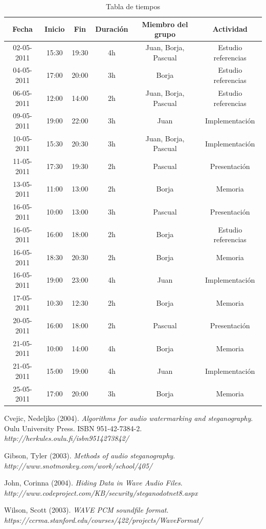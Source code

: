 \documentclass[12pt]{article}
\begin{document}
\begin{table}[h]

\centering
\begin{tabular}{|c|c|c|c|c|c|}
\hline Fecha & Inicio & Fin & Duración & Miembro del grupo & Actividad  \\ 
\hline 02-05-2011 & 15:30 & 19:30 & 4h & Juan, Borja, Pascual & Estudio referencias  \\
\hline 04-05-2011 & 17:00 & 20:00 & 3h & Borja & Estudio referencias  \\
\hline 06-05-2011 & 12:00 & 14:00 & 2h & Juan, Borja, Pascual & Estudio referencias  \\
\hline 09-05-2011 & 19:00 & 22:00 & 3h & Juan & Implementación  \\
\hline 10-05-2011 & 15:30 & 20:30 & 3h & Juan, Borja, Pascual & Implementación \\
\hline 11-05-2011 & 17:30 & 19:30 & 2h & Pascual & Presentación \\
\hline 13-05-2011 & 11:00 & 13:00 & 2h & Borja & Memoria \\
\hline 16-05-2011 & 10:00 & 13:00 & 3h & Pascual & Presentación \\
\hline 16-05-2011 & 16:00 & 18:00 & 2h & Borja & Estudio referencias \\
\hline 16-05-2011 & 18:30 & 20:30 & 2h & Borja & Memoria \\
\hline 16-05-2011 & 19:00 & 23:00 & 4h & Juan & Implementación \\
\hline 17-05-2011 & 10:30 & 12:30 & 2h & Borja & Memoria \\
\hline 20-05-2011 & 16:00 & 18:00 & 2h & Pascual & Presentación \\
\hline 21-05-2011 & 10:00 & 14:00 & 4h & Borja & Memoria \\
\hline 21-05-2011 & 15:00 & 19:00 & 4h & Juan & Implementación \\
\hline 25-05-2011 & 17:00 & 20:00 & 3h & Borja & Memoria \\
\hline 
\end{tabular}

\caption{Tabla de tiempos}
\end{table}

\newpage

\begin{thebibliography}{99}

Cvejic, Nedeljko (2004). \emph{Algorithms for audio watermarking and steganography}. Oulu University Press. ISBN 951-42-7384-2. \emph{http://herkules.oulu.fi/isbn9514273842/}


Gibson, Tyler (2003). \emph{Methods of audio steganography}. \emph{http://www.snotmonkey.com/work/school/405/}

John, Corinna (2004). \emph{Hiding Data in Wave Audio Files}. \emph{http://www.codeproject.com/KB/security/steganodotnet8.aspx}

Wilson, Scott (2003). \emph{WAVE PCM soundfile format}. \emph{https://ccrma.stanford.edu/courses/422/projects/WaveFormat/}

\end{thebibliography}
\end{document}
